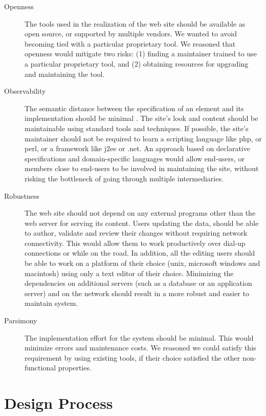 \documentclass[10pt]{article}
\begin{document}
\begin{description}
\item[Openness] The tools used in the realization of the web site
should be available as open source, or supported by multiple vendors.
We wanted to avoid becoming tied with a particular proprietary
tool.
We reasoned that openness would mitigate two risks:
(1) finding a maintainer trained to use a particular proprietary tool,
and (2) obtaining resources for upgrading and maintaining the tool.

\item[Observability]
The semantic distance between
the specification of an element and its implementation 
should be minimal \cite{SG97}.
The site's look and content should be maintainable
using standard tools and techniques.
If possible, the site's maintainer should not be required to
learn a scripting language like {\sc php}, or {\sc perl}, or
a framework like {\sc j2ee} or {\sc .net}.
An approach based on declarative specifications \cite{FFLS00} and
domain-specific languages \cite{DKV00, Spi00b} would allow end-users, or members
close to end-users to be involved in maintaining the site,
without risking the bottleneck of going through
multiple intermediaries.

\item[Robustness] The web site should not depend on
any external programs other than the web server for serving
its content.
Users updating the data, should be able to author, validate and 
review their changes without requiring network connectivity.
This would allow them to work productively over dial-up connections
or while on the road. In addition, all the editing users should be able 
to work on a platform of their choice ({\sc unix}, {\sc microsoft windows} and {\sc macintosh}) 
using only a text editor of their choice.
Minimizing the dependencies on additional servers (such as a
database or an application server) and on the network
should result in a more robust and easier to maintain system.   

\item[Parsimony] The implementation effort for
the system should be minimal.
This would minimize errors and maintenance costs.
We reasoned we could satisfy this requirement by
using existing tools, if their choice satisfied the
other non-functional properties.
\end{description} 

\section{Design Process}
\end{document}
